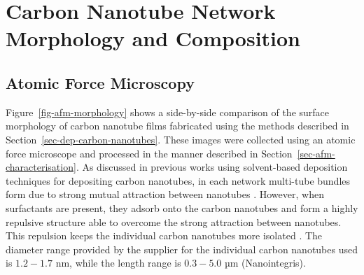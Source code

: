 \documentclass[
  a4paper,
]{scrbook}
\begin{document}
\hypertarget{sec-pristine-morphology}{%
\section{Carbon Nanotube Network Morphology and
Composition}\label{sec-pristine-morphology}}

\hypertarget{sec-pristine-AFM}{%
\subsection{Atomic Force Microscopy}\label{sec-pristine-AFM}}

Figure~\ref{fig-afm-morphology} shows a side-by-side comparison of the
surface morphology of carbon nanotube films fabricated using the methods
described in Section~\ref{sec-dep-carbon-nanotubes}. These images were
collected using an atomic force microscope and processed in the manner
described in Section~\ref{sec-afm-characterisation}. As discussed in
previous works using solvent-based deposition techniques for depositing
carbon nanotubes, in each network multi-tube bundles form due to strong
mutual attraction between nanotubes
\autocite{Zheng2017,Murugathas2018,Murugathas2019,Nguyen2021}. However,
when surfactants are present, they adsorb onto the carbon nanotubes and
form a highly repulsive structure able to overcome the strong attraction
between nanotubes. This repulsion keeps the individual carbon nanotubes
more isolated
\autocite{Wenseleers2004,Gavrel2013,Hermanson2013-16,Shimizu2013,DiCrescenzo2014,Yang2023}.
The diameter range provided by the supplier for the individual carbon
nanotubes used is \(1.2-1.7\) nm, while the length range is \(0.3-5.0\)
µm (Nanointegris).
\end{document}
